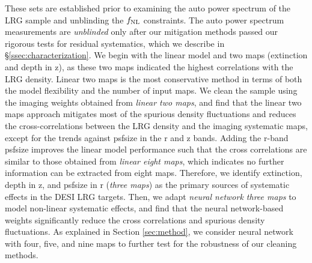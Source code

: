  These sets are established prior to examining the auto power spectrum of the LRG sample and unblinding the $f_{\rm NL}$ constraints. The auto power spectrum measurements are \textit{unblinded} only after our mitigation methods passed our rigorous tests for residual systematics, which we describe in \S \ref{ssec:characterization}. We begin with the linear model and two maps (extinction and depth in z), as these two maps indicated the highest correlations with the LRG density. Linear two maps is the most conservative method in terms of both the model flexibility and the number of input maps. We clean the sample using the imaging weights obtained from \textit{linear two maps}, and find that the linear two maps approach mitigates most of the spurious density fluctuations and reduces the cross-correlations between the LRG density and the imaging systematic maps, except for the trends against psfsize in the r and z bands. Adding the r-band psfsize improves the linear model performance such that the cross correlations are similar to those obtained from \textit{linear eight maps}, which indicates no further information can be extracted from eight maps. Therefore, we identify extinction, depth in z, and psfsize in r (\textit{three maps}) as the primary sources of systematic effects in the DESI LRG targets. Then, we adapt \textit{neural network three maps} to model non-linear systematic effects, and find that the neural network-based weights significantly reduce the cross correlations and spurious density fluctuations. As explained in Section \ref{sec:method}, we consider neural network with four, five, and nine maps to further test for the robustness of our cleaning methods.

